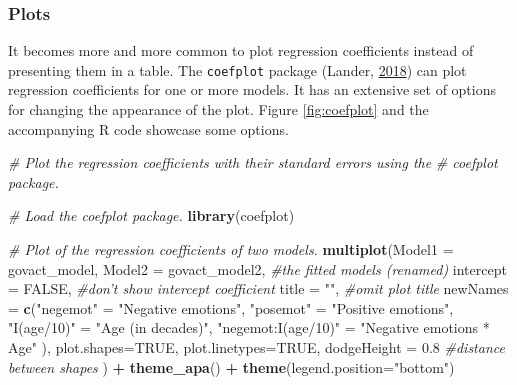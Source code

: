 \documentclass[doc,floatsintext]{apa6}
\newenvironment{Shaded}{\begin{snugshade}}{\end{snugshade}}
\newcommand{\KeywordTok}[1]{\textcolor[rgb]{0.13,0.29,0.53}{\textbf{#1}}}
\newcommand{\DataTypeTok}[1]{\textcolor[rgb]{0.13,0.29,0.53}{#1}}
\newcommand{\FloatTok}[1]{\textcolor[rgb]{0.00,0.00,0.81}{#1}}
\newcommand{\StringTok}[1]{\textcolor[rgb]{0.31,0.60,0.02}{#1}}
\newcommand{\CommentTok}[1]{\textcolor[rgb]{0.56,0.35,0.01}{\textit{#1}}}
\newcommand{\OtherTok}[1]{\textcolor[rgb]{0.56,0.35,0.01}{#1}}
\newcommand{\OperatorTok}[1]{\textcolor[rgb]{0.81,0.36,0.00}{\textbf{#1}}}
\newcommand{\NormalTok}[1]{#1}
\begin{document}
\subsubsection{Plots}\label{plots}

It becomes more and more common to plot regression coefficients instead
of presenting them in a table. The \texttt{coefplot} package (Lander,
\protect\hyperlink{ref-R-coefplot}{2018}) can plot regression
coefficients for one or more models. It has an extensive set of options
for changing the appearance of the plot. Figure \ref{fig:coefplot} and
the accompanying R code showcase some options.

\begin{Shaded}
\begin{Highlighting}[]
\CommentTok{# Plot the regression coefficients with their standard errors using the}
\CommentTok{# coefplot package.}

\CommentTok{# Load the coefplot package.}
\KeywordTok{library}\NormalTok{(coefplot)}

\CommentTok{# Plot of the regression coefficients of two models.}
\KeywordTok{multiplot}\NormalTok{(}\DataTypeTok{Model1 =}\NormalTok{ govact_model, }\DataTypeTok{Model2 =}\NormalTok{ govact_model2, }\CommentTok{#the fitted models (renamed)}
          \DataTypeTok{intercept =} \OtherTok{FALSE}\NormalTok{, }\CommentTok{#don't show intercept coefficient}
          \DataTypeTok{title =} \StringTok{""}\NormalTok{, }\CommentTok{#omit plot title}
          \DataTypeTok{newNames =} \KeywordTok{c}\NormalTok{(}\StringTok{"negemot"}\NormalTok{ =}\StringTok{ "Negative emotions"}\NormalTok{,}
                       \StringTok{"posemot"}\NormalTok{ =}\StringTok{ "Positive emotions"}\NormalTok{,}
                       \StringTok{"I(age/10)"}\NormalTok{ =}\StringTok{ "Age (in decades)"}\NormalTok{,}
                       \StringTok{"negemot:I(age/10)"}\NormalTok{ =}\StringTok{ "Negative emotions * Age"}
\NormalTok{                       ),}
          \DataTypeTok{plot.shapes=}\OtherTok{TRUE}\NormalTok{, }\DataTypeTok{plot.linetypes=}\OtherTok{TRUE}\NormalTok{,}
          \DataTypeTok{dodgeHeight =} \FloatTok{0.8} \CommentTok{#distance between shapes}
\NormalTok{          ) }\OperatorTok{+}
\StringTok{  }\KeywordTok{theme_apa}\NormalTok{() }\OperatorTok{+}
\StringTok{  }\KeywordTok{theme}\NormalTok{(}\DataTypeTok{legend.position=}\StringTok{"bottom"}\NormalTok{)}
\end{Highlighting}
\end{Shaded}
\end{document}
